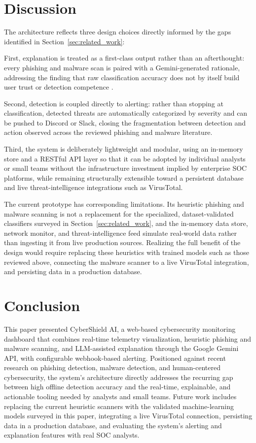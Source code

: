\documentclass[conference]{IEEEtran}
\begin{document}
\section{Discussion}
The architecture reflects three design choices directly informed by the gaps identified in Section~\ref{sec:related_work}:

First, explanation is treated as a first-class output rather than an afterthought: every phishing and malware scan is paired with a Gemini-generated rationale, addressing the finding that raw classification accuracy does not by itself build user trust or detection competence \cite{koide2026chatspamdetector, almarwani2026ai}. 

Second, detection is coupled directly to alerting: rather than stopping at classification, detected threats are automatically categorized by severity and can be pushed to Discord or Slack, closing the fragmentation between detection and action observed across the reviewed phishing and malware literature. 

Third, the system is deliberately lightweight and modular, using an in-memory store and a RESTful API layer so that it can be adopted by individual analysts or small teams without the infrastructure investment implied by enterprise SOC platforms, while remaining structurally extensible toward a persistent database and live threat-intelligence integrations such as VirusTotal.

The current prototype has corresponding limitations. Its heuristic phishing and malware scanning is not a replacement for the specialized, dataset-validated classifiers surveyed in Section~\ref{sec:related_work}, and the in-memory data store, network monitor, and threat-intelligence feed simulate real-world data rather than ingesting it from live production sources. Realizing the full benefit of the design would require replacing these heuristics with trained models such as those reviewed above, connecting the malware scanner to a live VirusTotal integration, and persisting data in a production database.

\section{Conclusion}
This paper presented CyberShield AI, a web-based cybersecurity monitoring dashboard that combines real-time telemetry visualization, heuristic phishing and malware scanning, and LLM-assisted explanation through the Google Gemini API, with configurable webhook-based alerting. Positioned against recent research on phishing detection, malware detection, and human-centered cybersecurity, the system's architecture directly addresses the recurring gap between high offline detection accuracy and the real-time, explainable, and actionable tooling needed by analysts and small teams. Future work includes replacing the current heuristic scanners with the validated machine-learning models surveyed in this paper, integrating a live VirusTotal connection, persisting data in a production database, and evaluating the system's alerting and explanation features with real SOC analysts.
\end{document}
